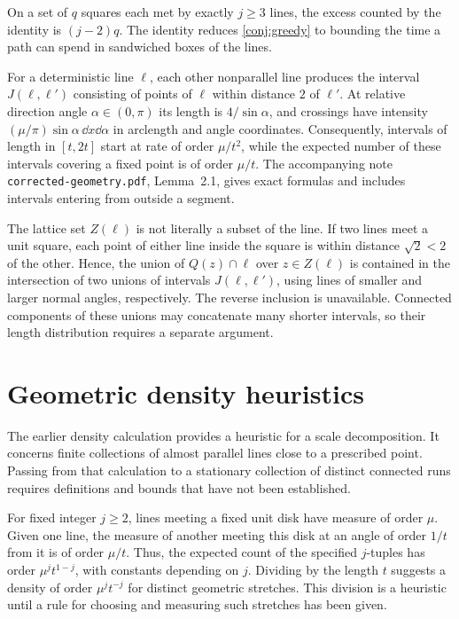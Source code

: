 \documentclass[11pt,letterpaper]{article}
\begin{document}
On a set of $q$ squares each met by exactly $j\ge3$ lines, the excess counted by the identity is $(j-2)q$. The identity reduces \cref{conj:greedy} to bounding the time a path can spend in sandwiched boxes of the lines.

For a deterministic line $\ell$, each other nonparallel line produces the interval $J(\ell,\ell')$ consisting of points of $\ell$ within distance $2$ of $\ell'$. At relative direction angle $\alpha\in(0,\pi)$ its length is $4/\sin\alpha$, and crossings have intensity $(\mu/\pi)\sin\alpha\,\dd x\dd\alpha$ in arclength and angle coordinates. Consequently, intervals of length in $[t,2t]$ start at rate of order $\mu/t^2$, while the expected number of these intervals covering a fixed point is of order $\mu/t$. The accompanying note \texttt{corrected-geometry.pdf}, Lemma~2.1, gives exact formulas and includes intervals entering from outside a segment.

The lattice set $Z(\ell)$ is not literally a subset of the line. If two lines meet a unit square, each point of either line inside the square is within distance $\sqrt2<2$ of the other. Hence, the union of $Q(z)\cap\ell$ over $z\in Z(\ell)$ is contained in the intersection of two unions of intervals $J(\ell,\ell')$, using lines of smaller and larger normal angles, respectively. The reverse inclusion is unavailable. Connected components of these unions may concatenate many shorter intervals, so their length distribution requires a separate argument.

\section{Geometric density heuristics}
\label{sec:bundles}

The earlier density calculation provides a heuristic for a scale decomposition. It concerns finite collections of almost parallel lines close to a prescribed point. Passing from that calculation to a stationary collection of distinct connected runs requires definitions and bounds that have not been established.

For fixed integer $j\ge2$, lines meeting a fixed unit disk have measure of order $\mu$. Given one line, the measure of another meeting this disk at an angle of order $1/t$ from it is of order $\mu/t$. Thus, the expected count of the specified $j$-tuples has order $\mu^jt^{1-j}$, with constants depending on $j$. Dividing by the length $t$ suggests a density of order $\mu^jt^{-j}$ for distinct geometric stretches. This division is a heuristic until a rule for choosing and measuring such stretches has been given.
\end{document}
